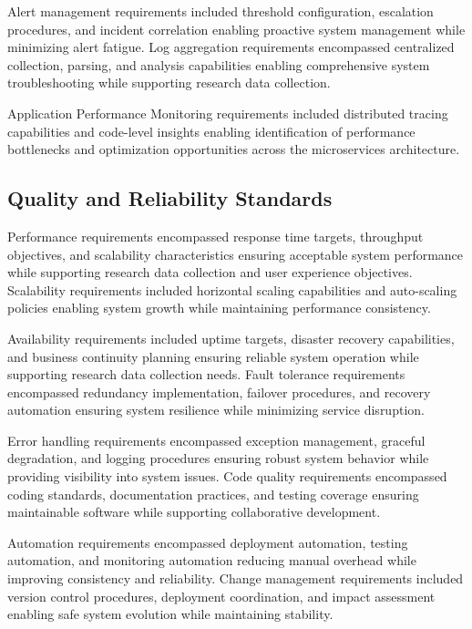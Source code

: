 Alert management requirements included threshold configuration, escalation procedures, and incident correlation enabling proactive system management while minimizing alert fatigue. Log aggregation requirements encompassed centralized collection, parsing, and analysis capabilities enabling comprehensive system troubleshooting while supporting research data collection.

Application Performance Monitoring requirements included distributed tracing capabilities and code-level insights enabling identification of performance bottlenecks and optimization opportunities across the microservices architecture.

\subsection{Quality and Reliability Standards}

Performance requirements encompassed response time targets, throughput objectives, and scalability characteristics ensuring acceptable system performance while supporting research data collection and user experience objectives. Scalability requirements included horizontal scaling capabilities and auto-scaling policies enabling system growth while maintaining performance consistency.


Availability requirements included uptime targets, disaster recovery capabilities, and business continuity planning ensuring reliable system operation while supporting research data collection needs. Fault tolerance requirements encompassed redundancy implementation, failover procedures, and recovery automation ensuring system resilience while minimizing service disruption.

Error handling requirements encompassed exception management, graceful degradation, and logging procedures ensuring robust system behavior while providing visibility into system issues. Code quality requirements encompassed coding standards, documentation practices, and testing coverage ensuring maintainable software while supporting collaborative development.

Automation requirements encompassed deployment automation, testing automation, and monitoring automation reducing manual overhead while improving consistency and reliability. Change management requirements included version control procedures, deployment coordination, and impact assessment enabling safe system evolution while maintaining stability.

